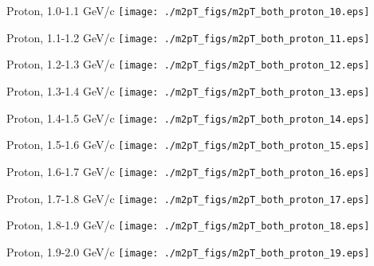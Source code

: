 \documentclass[compress]{beamer} %
\begin{document}
\begin{frame}{Proton, 1.0-1.1 GeV/c}
\texttt{[image: ./m2pT\_figs/m2pT\_both\_proton\_10.eps]}
\end{frame}
\begin{frame}{Proton, 1.1-1.2 GeV/c}
\texttt{[image: ./m2pT\_figs/m2pT\_both\_proton\_11.eps]}
\end{frame}
\begin{frame}{Proton, 1.2-1.3 GeV/c}
\texttt{[image: ./m2pT\_figs/m2pT\_both\_proton\_12.eps]}
\end{frame}
\begin{frame}{Proton, 1.3-1.4 GeV/c}
\texttt{[image: ./m2pT\_figs/m2pT\_both\_proton\_13.eps]}
\end{frame}
\begin{frame}{Proton, 1.4-1.5 GeV/c}
\texttt{[image: ./m2pT\_figs/m2pT\_both\_proton\_14.eps]}
\end{frame}
\begin{frame}{Proton, 1.5-1.6 GeV/c}
\texttt{[image: ./m2pT\_figs/m2pT\_both\_proton\_15.eps]}
\end{frame}
\begin{frame}{Proton, 1.6-1.7 GeV/c}
\texttt{[image: ./m2pT\_figs/m2pT\_both\_proton\_16.eps]}
\end{frame}
\begin{frame}{Proton, 1.7-1.8 GeV/c}
\texttt{[image: ./m2pT\_figs/m2pT\_both\_proton\_17.eps]}
\end{frame}
\begin{frame}{Proton, 1.8-1.9 GeV/c}
\texttt{[image: ./m2pT\_figs/m2pT\_both\_proton\_18.eps]}
\end{frame}
\begin{frame}{Proton, 1.9-2.0 GeV/c}
\texttt{[image: ./m2pT\_figs/m2pT\_both\_proton\_19.eps]}
\end{frame}
\end{document}
